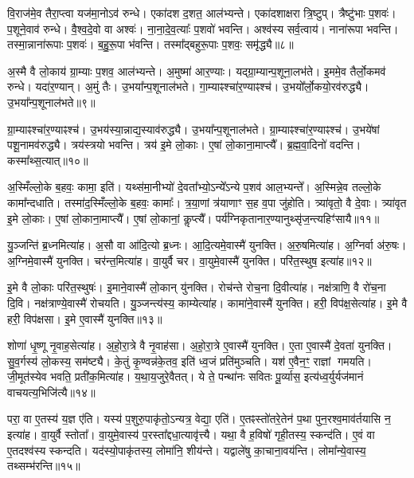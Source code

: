 वि॒राज॑मे॒व तैरा॒प्त्वा यज॑मा॒नो\-ऽव॑ रुन्धे।
एका॑दश द॒शत॒ आल॑भ्यन्ते।
एका॑दशाक्षरा त्रि॒ष्टुप्।
त्रैष्टु॑भाः प॒शवः॑।
प॒शूने॒वाव॑ रुन्धे।
वै॒श्व॒दे॒वो वा अश्वः॑।
ना॒ना॒दे॒व॒त्याः᳚ प॒शवो॑ भवन्ति।
अश्व॑स्य सर्व॒त्वाय॑।
नाना॑रूपा भवन्ति।
तस्मा॒न्नाना॑रूपाः प॒शवः॑।
ब॒हु॒रू॒पा भ॑वन्ति।
तस्मा᳚द्बहुरू॒पाः प॒शवः॒ समृ॑द्ध्यै॥८॥\anuvakamend[आ॒र॒ण्याँल्लो॒को द॒शिन॑ आल॒भ्यन्ते॒ नाना॑रूपाः प॒शवो॒ द्वे च॑]

अ॒स्मै वै लो॒काय॑ ग्रा॒म्याः प॒शव॒ आल॑भ्यन्ते।
अ॒मुष्मा॑ आर॒ण्याः।
यद्ग्रा॒म्यान्प॒शूना॒लभ॑ते।
इ॒ममे॒व तैर्लो॒कमव॑ रुन्धे।
यदा॑र॒ण्यान्।
अ॒मुं तैः।
उ॒भया᳚न्प॒शूनाल॑भते।
गा॒म्याꣴश्चा॑र॒ण्याꣴश्च॑।
उ॒भयो᳚र्लो॒कयो॒रव॑रुद्ध्यै।
उ॒भया᳚न्प॒शूना\-ल॑भते॥९॥

ग्रा॒म्याꣴश्चा॑र॒ण्याꣴश्च॑।
उ॒भय॑स्या॒न्नाद्य॒स्याव॑रुद्ध्यै।
उ॒भया᳚न्प॒शूनाल॑भते।
ग्रा॒म्याꣴश्चा॑र॒ण्याꣴश्च॑।
उ॒भये॑षां पशू॒नामव॑रुद्ध्यै।
त्रय॑स्त्रयो भवन्ति।
त्रय॑ इ॒मे लो॒काः।
ए॒षां लो॒काना॒माप्त्यै᳚।
ब्र॒ह्म॒वा॒दिनो॑ वदन्ति।
कस्मा᳚थ्स॒त्यात्॥१०॥

अ॒स्मिँल्लो॒के ब॒हवः॒ कामा॒ इति॑।
यथ्स॑मा॒नीभ्यो॑ दे॒वता᳚भ्यो॒\-ऽन्ये᳚\-ऽन्ये प॒शव॑ आल॒भ्यन्ते᳚।
अ॒स्मिन्ने॒व तल्लो॒के कामा᳚न्दधाति।
तस्मा॑द॒स्मिँल्लो॒के ब॒हवः॒ कामाः᳚।
त्र॒या॒णां त्र॑याणाꣳ स॒ह व॒पा जु॑होति।
त्र्या॑वृतो॒ वै दे॒वाः।
त्र्या॑वृत इ॒मे लो॒काः।
ए॒षां लो॒काना॒माप्त्यै᳚।
ए॒षां लो॒कानां॒ कॢप्त्यै᳚।
पर्य॑ग्निकृतानार॒ण्यानुथ्सृ॑ज॒न्त्यहिꣳ॑सायै॥११॥\anuvakamend[अव॑रुद्ध्या उ॒भया᳚न्प॒शूनाल॑भते स॒त्यादहिꣳ॑सायै]

यु॒ञ्जन्ति॑ ब्र॒ध्नमित्या॑ह।
अ॒सौ वा आ॑दि॒त्यो ब्र॒ध्नः।
आ॒दि॒त्यमे॒वास्मै॑ युनक्ति।
अ॒रु॒षमित्या॑ह।
अ॒ग्निर्वा अ॑रु॒षः।
अ॒ग्निमे॒वास्मै॑ युनक्ति।
चर॑न्त॒मित्या॑ह।
वा॒युर्वै चर\sn{}।
वा॒युमे॒वास्मै॑ युनक्ति।
परि॑त॒स्थुष॒ इत्या॑ह॥१२॥

इ॒मे वै लो॒काः परि॑त॒स्थुषः॑।
इ॒माने॒वास्मै॑ लो॒कान् यु॑नक्ति।
रोच॑न्ते रोच॒ना दि॒वीत्या॑ह।
नक्ष॑त्राणि॒ वै रो॑च॒ना दि॒वि।
नक्ष॑त्राण्ये॒वास्मै॑ रोचयति।
यु॒ञ्जन्त्य॑स्य॒ काम्येत्या॑ह।
कामा॑ने॒वास्मै॑ युनक्ति।
हरी॒ विप॑क्ष॒सेत्या॑ह।
इ॒मे वै हरी॒ विप॑क्षसा।
इ॒मे ए॒वास्मै॑ युनक्ति॥१३॥

शोणा॑ धृ॒ष्णू नृ॒वाह॒सेत्या॑ह।
अ॒हो॒रा॒त्रे वै नृ॒वाह॑सा।
अ॒हो॒रा॒त्रे ए॒वास्मै॑ युनक्ति।
ए॒ता ए॒वास्मै॑ दे॒वता॑ युनक्ति।
सु॒व॒र्गस्य॑ लो॒कस्य॒ सम॑ष्ट्यै।
के॒तुं कृ॒ण्वन्न॑के॒तव॒ इति॑ ध्व॒जं प्रति॑\-मुञ्चति।
यश॑ ए॒वैन॒ꣳ॒ राज्ञां गमयति।
जी॒मूत॑स्येव भवति॒ प्रती॑क॒मित्या॑ह।
य॒था॒य॒जुरे॒वैतत्।
ये ते॒ पन्था॑नः सवितः पू॒र्व्यास॒ इत्य॑ध्व॒र्युर्यज॑मानं वाचयत्य॒भिजि॑त्यै॥१४॥

परा॒ वा ए॒तस्य॑ य॒ज्ञ ए॑ति।
यस्य॑ प॒शुरु॒पाकृ॑तो॒\-ऽन्यत्र॒ वेद्या॒ एति॑।
ए॒तꣴस्तो॑तरे॒तेन॑ प॒था पुन॒रश्व॒माव॑र्तयासि न॒ इत्या॑ह।
वा॒युर्वै स्तोता᳚।
वा॒युमे॒वास्य॑ प॒रस्ता᳚द्दधा॒त्यावृ॑त्त्यै।
यथा॒ वै ह॒विषो॑ गृही॒तस्य॒ स्कन्द॑ति।
ए॒वं वा ए॒तदश्व॑स्य स्कन्दति।
यद॑स्यो॒पाकृ॑तस्य॒ लोमा॑नि॒ शीय॑न्ते।
यद्वाले॑षु का॒चाना॒वय॑न्ति।
लोमा᳚न्ये॒वास्य॒ तथ्सम्भ॑रन्ति॥१५॥

